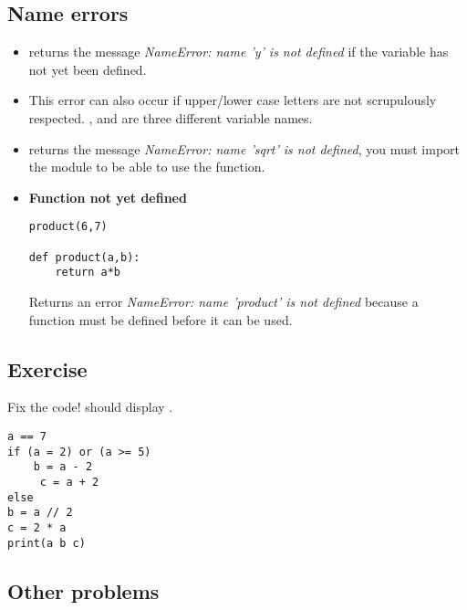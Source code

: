 \documentclass[11pt,class=report,crop=false]{standalone}
\begin{document}
\subsection{Name errors}

\begin{itemize}
  
  \item {} \quad \Python{} returns the message \emph{NameError: name 'y' is not defined} if the variable  has not yet been defined.
  
  \item This error can also occur if upper/lower case letters are not scrupulously respected. 
  ,  and  are three different variable names.
  
  \item {} \quad \Python{} returns the message \emph{NameError: name 'sqrt' is not defined}, you must import the  module to be able to use the  function.
  
   \item \textbf{Function not yet defined}  
   
\begin{lstlisting}
product(6,7)

def product(a,b):
    return a*b
\end{lstlisting}   
  
Returns an error \emph{NameError: name 'product' is not defined} because a function must be defined before it can be used.
\end{itemize}


  
\subsection{Exercise}

Fix the code! \Python{} should display .

\begin{lstlisting}
a == 7
if (a = 2) or (a >= 5) 
    b = a - 2
     c = a + 2
else
b = a // 2
c = 2 * a
print(a b c)
\end{lstlisting}



\subsection{Other problems}
\end{document}
